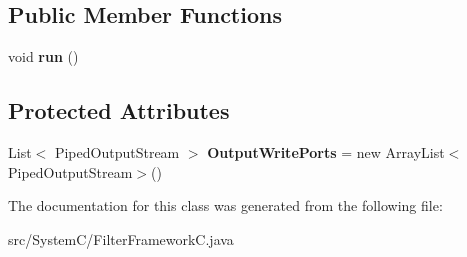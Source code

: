 \subsection*{Public Member Functions}
\begin{DoxyCompactItemize}
\item 
\hypertarget{class_system_c_1_1_filter_framework_c_af195ed983ec67dea6718a82d3d982ad4}{}void {\bfseries run} ()\label{class_system_c_1_1_filter_framework_c_af195ed983ec67dea6718a82d3d982ad4}

\end{DoxyCompactItemize}
\subsection*{Protected Attributes}
\begin{DoxyCompactItemize}
\item 
\hypertarget{class_system_c_1_1_filter_framework_c_aaf8305f98a2cacdf8c72598f080cc9d6}{}List$<$ Piped\+Output\+Stream $>$ {\bfseries Output\+Write\+Ports} = new Array\+List$<$Piped\+Output\+Stream$>$()\label{class_system_c_1_1_filter_framework_c_aaf8305f98a2cacdf8c72598f080cc9d6}

\end{DoxyCompactItemize}


The documentation for this class was generated from the following file\+:\begin{DoxyCompactItemize}
\item 
src/\+System\+C/Filter\+Framework\+C.\+java\end{DoxyCompactItemize}
